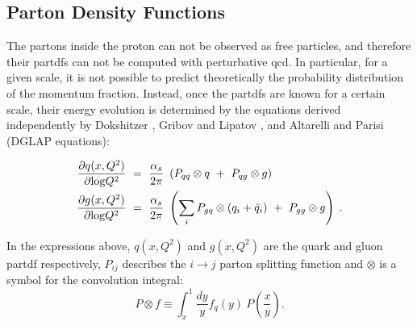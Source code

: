 


\subsection{Parton Density Functions}
\label{sec:protpdf}

The partons inside the proton can not be observed as free particles, and therefore their \glspl{partdf} can not be computed with
perturbative \gls{qcd}. In particular, for a given scale, it is not possible to predict theoretically the probability distribution 
of the momentum fraction. Instead, once the \glspl{partdf} are known for a certain scale, their energy evolution is 
determined by the equations derived independently by Dokshitzer \cite{Dokshitzer:1977sg} , Gribov and Lipatov \cite{Gribov:1972ri}, and Altarelli and Parisi \cite{ALTARELLI1977298} (DGLAP equations):

\begin{equation}
\begin{aligned}
\frac{\partial q(x,Q^2)}{\partial {\rm log}Q^2}~&=~\frac{\alpha_s}{2\pi}~\left( P_{qq} \otimes q~+~P_{qg} \otimes g \right) \, \\
\frac{\partial g(x,Q^2)}{\partial {\rm log}Q^2}~&=~\frac{\alpha_s}{2\pi}~\left( \sum_i P_{gq} \otimes (q_i+\bar{q}_i)~+~P_{gg} \otimes g \right) \; .
\label{eq:glap1}
\end{aligned}
\end{equation}

\noindent In the expressions above, $q(x,Q^2)$ and $g(x,Q^2)$ are the quark and gluon \gls{partdf} respectively, 
$P_{ij}$ describes the $i \to j$ parton splitting function
and $\otimes$ is a symbol for the convolution integral:
\begin{equation}
P \otimes f \equiv \int^1_x\frac{dy}{y}f_q(y)~P\left(\frac{x}{y}\right).
\end{equation}

